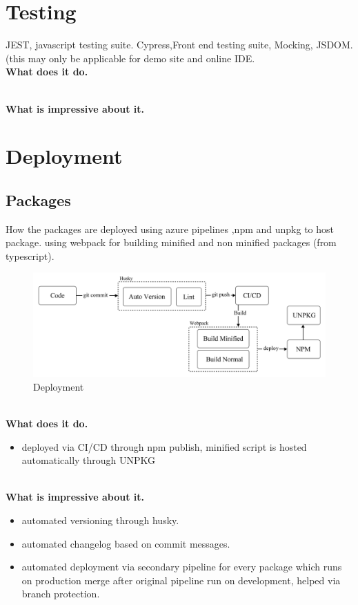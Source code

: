 \documentclass{l4proj}
\begin{document}
\section{Testing}
\text JEST, javascript testing suite. Cypress,Front end testing suite, Mocking, JSDOM. (this may only be applicable for demo site and online IDE.
\\
\textbf{What does it do.}

\\
\textbf{What is impressive about it.}



\section{Deployment}
\subsection{Packages}
\text How the packages are deployed using azure pipelines ,npm and unpkg to host package. using webpack for building minified and non minified packages (from typescript).

\begin{figure}[!ht]
    \begin{center}
    \includegraphics[width=14cm]{dissertation/images/Deployment.png}
    \end{center}
    \caption{Deployment}
    \label{fig:deployment}
\end{figure}
\\
\textbf{What does it do.}
\begin{itemize}
    \item deployed via CI/CD through npm publish, minified script is hosted automatically through UNPKG
\end{itemize}
\\
\textbf{What is impressive about it.}
\begin{itemize}
    \item automated versioning through husky.
    \item automated changelog based on commit messages.
    \item automated deployment via secondary pipeline for every package which runs on production merge after original pipeline run on development, helped via branch protection.
\end{itemize}
\end{document}

